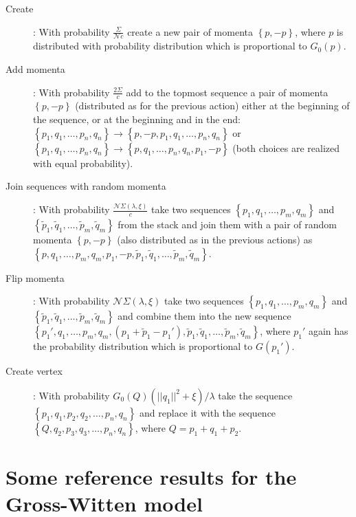 \documentclass[twocolumn,showpacs,preprintnumbers,superscriptaddress,amsmath,floatfix,amssymb,secnumarabic]{revtex4}
\newcommand{\lr}[1]{ \left( #1 \right) }
\newcommand{\lrc}[1]{ \left\{ #1 \right\} }
\begin{document}
\begin{description}
 \item[Create]: With probability $\frac{\Sigma}{\mathcal{N} c}$ create a new pair of momenta $\lrc{p, -p}$, where $p$ is distributed with probability distribution which is proportional to $G_0\lr{p}$.
 \item[Add momenta]: With probability $\frac{2 \Sigma}{c}$ add to the topmost sequence a pair of momenta $\lrc{p, -p}$ (distributed as for the previous action) either at the beginning of the sequence, or at the beginning and in the end: $\lrc{p_1, q_1, \ldots, p_n, q_n} \rightarrow \lrc{p, -p, p_1, q_1, \ldots, p_n, q_n}$ or $\lrc{p_1, q_1, \ldots, p_n, q_n} \rightarrow \lrc{p, q_1, \ldots, p_n, q_n, p_1, -p}$ (both choices are realized with equal probability).
 \item[Join sequences with random momenta]: With probability $\frac{\mathcal{N} \Sigma\lr{\lambda, \xi}}{c}$ take two sequences $\lrc{p_1, q_1, \ldots, p_m, q_m}$ and $\lrc{\tilde{p}_1, \tilde{q}_1, \ldots, \tilde{p}_m, \tilde{q}_m}$ from the stack and join them with a pair of random momenta $\lrc{p, -p}$ (also distributed as in the previous actions) as $\lrc{p, q_1, \ldots, p_m, q_m, p_1, -p, \tilde{p}_1, \tilde{q}_1, \ldots, \tilde{p}_m, \tilde{q}_m}$.
 \item[Flip momenta]: With probability $\mathcal{N} \Sigma\lr{\lambda, \xi}$ take two sequences $\lrc{p_1, q_1, \ldots, p_m, q_m}$ and $\lrc{\tilde{p}_1, \tilde{q}_1, \ldots, \tilde{p}_m, \tilde{q}_m}$ and combine them into the new sequence $\lrc{p_1', q_1, \ldots, p_m, q_m, \lr{p_1 + \tilde{p}_1 - p_1'}, \tilde{p}_1, \tilde{q}_1, \ldots, \tilde{p}_m, \tilde{q}_m}$, where $p_1'$ again has the probability distribution which is proportional to $G\lr{p_1'}$.
 \item[Create vertex]: With probability $G_0\lr{Q} \lr{||q_1||^2 + \xi}/\lambda$ take the sequence $\lrc{p_1, q_1, p_2, q_2, \ldots, p_n, q_n}$ and replace it with the sequence $\lrc{Q, q_2, p_3, q_3, \ldots, p_n, q_n}$, where $Q = p_1 + q_1 + p_2$.
\end{description}

\section{Some reference results for the Gross-Witten model}
\end{document}
